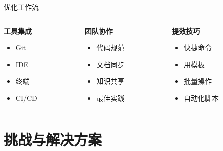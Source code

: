 \documentclass[aspectratio=169,xcolor=dvipsnames]{beamer}
\begin{document}
\begin{frame}{优化工作流}
  \begin{columns}
    \begin{column}{0.3\textwidth}
      \textbf{工具集成}
      \begin{itemize}
        \item Git
        \item IDE
        \item 终端
        \item CI/CD
      \end{itemize}
    \end{column}
    \begin{column}{0.3\textwidth}
      \textbf{团队协作}
      \begin{itemize}
        \item 代码规范
        \item 文档同步
        \item 知识共享
        \item 最佳实践
      \end{itemize}
    \end{column}
    \begin{column}{0.3\textwidth}
      \textbf{提效技巧}
      \begin{itemize}
        \item 快捷命令
        \item 用模板
        \item 批量操作
        \item 自动化脚本
      \end{itemize}
    \end{column}
  \end{columns}
\end{frame}

\section{挑战与解决方案}
\end{document}
